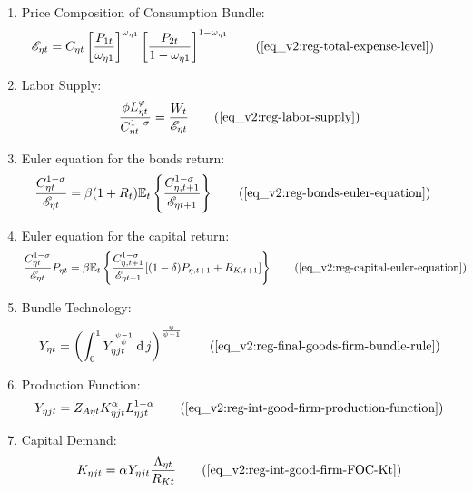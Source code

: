\documentclass[../thesis.tex]{subfiles}
\begin{document}
{\begin{itemize}
\begin{enumerate}
\begin{tcolorbox}[colback=red!5!white,colframe=red!75!black]
\begin{comment}
		\end{comment}
				
		\end{tcolorbox}

		\item Price Composition of Consumption Bundle:
		\begin{align}
			\te &= C_{\eta t} \left[ \frac{P_{1 t}}{\omega_{\eta 1}} \right]^{\omega_{\eta 1}} \left[ \frac{P_{2 t}}{1 -\omega_{\eta 1}} \right]^{1 -\omega_{\eta 1}} \tag{\ref{eq_v2:reg-total-expense-level}}
		\end{align}

		\item Labor Supply:
		\begin{align}
			\frac{\phi L_{\eta t}^{\varphi}}{C_{\eta t}^{1-\sigma}} = \frac{W_t}{\te} \tag{\ref{eq_v2:reg-labor-supply}}
		\end{align}

		\item Euler equation for the bonds return:
		\begin{align}
			\frac{ C_{\eta t}^{1-\sigma}}{ \te} &= \beta (1 + R_{t}) \E \left\{ \frac{ C_{\eta, t+1}^{1-\sigma}}{ \te[t+1]} \right\} \tag{\ref{eq_v2:reg-bonds-euler-equation}}
		\end{align}
		
		\item Euler equation for the capital return:
		\begin{align}
			\frac{ C_{\eta t}^{1-\sigma}}{ \te} P_{\eta t} &= \beta \mathbb{E}_t \left\{ \frac{ C_{\eta, t+1}^{1-\sigma}}{ \te[t+1]} [(1-\delta) P_{\eta, t+1} + R_{K,t+1}] \right\} \tag{\ref{eq_v2:reg-capital-euler-equation}}
		\end{align}
					
		\item Bundle Technology:
		\begin{align}
			Y_{\eta t} = \left( \int_{0}^{1} Y_{\eta jt}^{\frac{\psi-1}{\psi}} \dif j \right)^{\frac{\psi}{\psi-1}} \tag{\ref{eq_v2:reg-final-goods-firm-bundle-rule}}
		\end{align}
		
		\item Production Function:
		\begin{align}
			Y_{\eta jt} = Z_{A\eta t} K_{\eta jt}^{\alpha_{}} L_{\eta jt}^{1-{\alpha_{}}} \tag{\ref{eq_v2:reg-int-good-firm-production-function}}
		\end{align}
		
		\item Capital Demand:
		\begin{align}
			K_{\eta jt} = {\alpha_{}} Y_{\eta jt} \frac{\Lambda_{\eta t}}{R_{Kt}} \tag{\ref{eq_v2:reg-int-good-firm-FOC-Kt}}
		\end{align}
		

\end{enumerate}
\end{itemize}}
\end{document}
